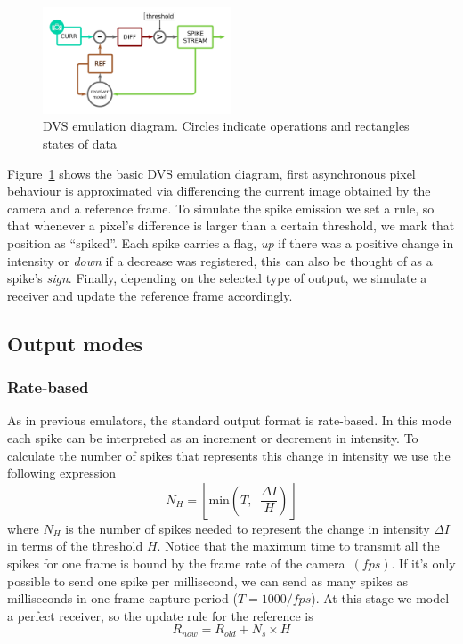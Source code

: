 \documentclass[twocolumn]{article}
\begin{document}
%
\begin{figure}[htb]
  \includegraphics[width=0.5\textwidth]{dvs_emu}
  
  \caption{DVS emulation diagram. Circles indicate operations and rectangles states of data}
  \label{fig:dvs_emu}
\end{figure}

Figure~\ref{fig:dvs_emu} shows the basic DVS emulation diagram, first asynchronous pixel behaviour is approximated via differencing the current image obtained by the camera and a reference frame. To simulate the spike emission we set a rule, so that whenever a pixel's difference is larger than a certain threshold, we mark that position as ``spiked''. Each spike carries a flag, \textit{up} if there was a positive change in intensity or \textit{down} if a decrease was registered, this can also be thought of as a spike's \textit{sign}. Finally, depending on the selected type of output, we simulate a receiver and update the reference frame accordingly. 


\subsection{Output modes}
\subsubsection{Rate-based}
As in previous emulators\cite{dvs_emu}, the standard output format is rate-based. In this mode each spike can be interpreted as an increment or decrement in intensity. To calculate the number of spikes that represents this change in intensity we use the following expression
\begin{equation}
  \label{eq:num_spikes_rate}
  N_{H} = \left\lfloor \mathrm{min}\left( T, \;\; \frac{\Delta I}{H} \right) \right\rfloor
\end{equation}
where $N_{H}$ is the number of spikes needed to represent the change in intensity $\Delta I$ in terms of the threshold $H$. Notice that the maximum time to transmit all the spikes for one frame is bound by the frame rate of the camera~$(fps)$. If it's only possible to send one spike per millisecond, we can send as many spikes as milliseconds in one frame-capture period ($T = 1000/fps$). At this stage we model a perfect receiver, so the update rule for the reference is
\begin{equation}
  \label{eq:ref_update}
  R_{now} = R_{old} + N_{s}\times H
\end{equation}
\end{document}
